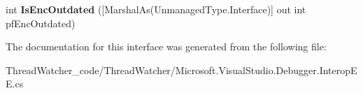\begin{DoxyCompactItemize}
\item 
\hypertarget{interface_microsoft_1_1_visual_studio_1_1_debugger_1_1_interop_e_e_1_1_i_debug_object2_ad12400abf36a42cee8096613da926332}{int {\bfseries Is\+Enc\+Outdated} (\mbox{[}Marshal\+As(Unmanaged\+Type.\+Interface)\mbox{]} out int pf\+Enc\+Outdated)}\label{interface_microsoft_1_1_visual_studio_1_1_debugger_1_1_interop_e_e_1_1_i_debug_object2_ad12400abf36a42cee8096613da926332}

\end{DoxyCompactItemize}


The documentation for this interface was generated from the following file\+:\begin{DoxyCompactItemize}
\item 
Thread\+Watcher\+\_\+code/\+Thread\+Watcher/Microsoft.\+Visual\+Studio.\+Debugger.\+Interop\+E\+E.\+cs\end{DoxyCompactItemize}
